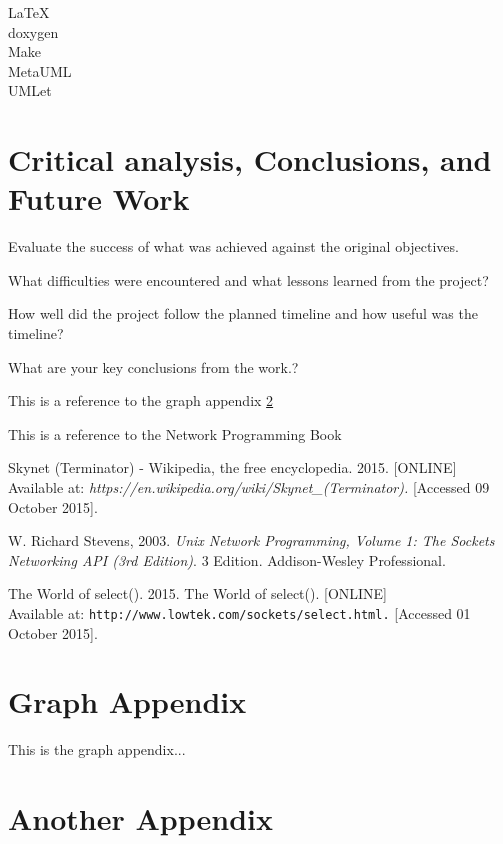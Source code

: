 \documentclass[12pt,a4paper,titlepage]{article}
\begin{document}
LaTeX\\
doxygen\\
Make\\
MetaUML\\
UMLet\\

\section{Critical analysis, Conclusions, and Future Work}

Evaluate the success of what was achieved against the original objectives. 

What difficulties were encountered and what lessons learned from the project? 

How well did the project follow the planned timeline and how useful was the timeline?  

What are your key conclusions from the work.?

This is a reference to the graph appendix \ref{appendix:graph}

This is a reference to the Network Programming Book \cite[p.~215]{stevensunp}

\newpage

\begin{thebibliography}{99}

Skynet (Terminator) - Wikipedia, the free encyclopedia. 2015. [ONLINE] Available at: \textit{https://en.wikipedia.org/wiki/Skynet\_(Terminator).} [Accessed 09 October 2015].

W. Richard Stevens, 2003. \textit{Unix Network Programming, Volume 1: The Sockets Networking API (3rd Edition)}. 3 Edition. Addison-Wesley Professional.

The World of select(). 2015. The World of select(). [ONLINE] \\
Available at: \texttt{http://www.lowtek.com/sockets/select.html.} [Accessed 01 October 2015].

\end{thebibliography}



\newpage
\begin{appendices}

\section{Graph Appendix}
\label{appendix:graph}
This is the graph appendix...

\section{Another Appendix}

\end{appendices}
\end{document}
